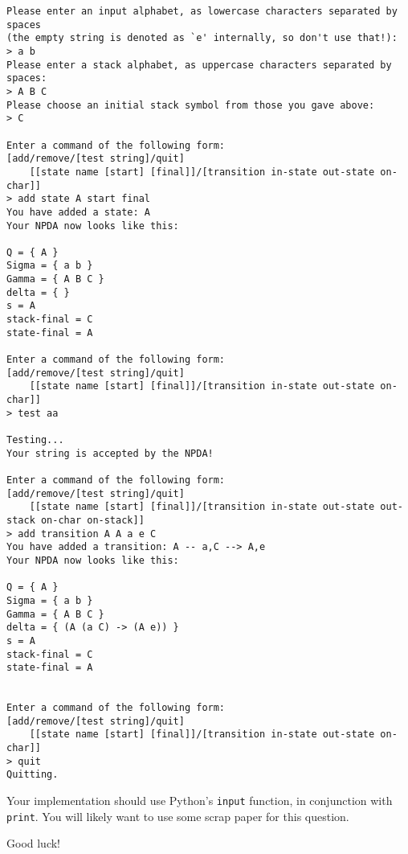 \documentclass[addpoints]{exam}
\begin{document}
\begin{questions}
\begin{verbatim}
Please enter an input alphabet, as lowercase characters separated by spaces
(the empty string is denoted as `e' internally, so don't use that!):
> a b
Please enter a stack alphabet, as uppercase characters separated by spaces:
> A B C
Please choose an initial stack symbol from those you gave above:
> C

Enter a command of the following form: 
[add/remove/[test string]/quit] 
    [[state name [start] [final]]/[transition in-state out-state on-char]]
> add state A start final
You have added a state: A
Your NPDA now looks like this:

Q = { A }
Sigma = { a b }
Gamma = { A B C }
delta = { }
s = A
stack-final = C
state-final = A

Enter a command of the following form: 
[add/remove/[test string]/quit] 
    [[state name [start] [final]]/[transition in-state out-state on-char]]
> test aa

Testing...
Your string is accepted by the NPDA!

Enter a command of the following form: 
[add/remove/[test string]/quit] 
    [[state name [start] [final]]/[transition in-state out-state out-stack on-char on-stack]]
> add transition A A a e C
You have added a transition: A -- a,C --> A,e
Your NPDA now looks like this:

Q = { A }
Sigma = { a b }
Gamma = { A B C }
delta = { (A (a C) -> (A e)) }
s = A
stack-final = C
state-final = A


Enter a command of the following form: 
[add/remove/[test string]/quit] 
    [[state name [start] [final]]/[transition in-state out-state on-char]]
> quit
Quitting.
\end{verbatim}

Your implementation should use Python's \texttt{input} function, in conjunction with \texttt{print}. You will likely want to use some scrap paper for this question.

Good luck!

\newpage

\end{questions}
\end{document}
